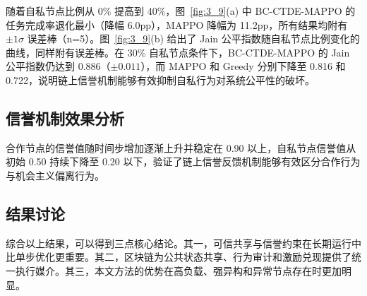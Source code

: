 随着自私节点比例从 0\% 提高到 40\%，图~\ref{fig:3_9}(a) 中 BC-CTDE-MAPPO 的任务完成率退化最小（降幅 6.0pp），MAPPO 降幅为 11.2pp，所有结果均附有 $\pm1\sigma$ 误差棒（n=5）。图~\ref{fig:3_9}(b) 给出了 Jain 公平指数随自私节点比例变化的曲线，同样附有误差棒。在 30\% 自私节点条件下，BC-CTDE-MAPPO 的 Jain 公平指数仍达到 0.886（$\pm0.011$），而 MAPPO 和 Greedy 分别下降至 0.816 和 0.722，说明链上信誉机制能够有效抑制自私行为对系统公平性的破坏。

\subsection{信誉机制效果分析}
合作节点的信誉值随时间步增加逐渐上升并稳定在 0.90 以上，自私节点信誉值从初始 0.50 持续下降至 0.20 以下，验证了链上信誉反馈机制能够有效区分合作行为与机会主义偏离行为。

\subsection{结果讨论}
综合以上结果，可以得到三点核心结论。其一，可信共享与信誉约束在长期运行中比单步优化更重要。其二，区块链为公共状态共享、行为审计和激励兑现提供了统一执行媒介。其三，本文方法的优势在高负载、强异构和异常节点存在时更加明显。
